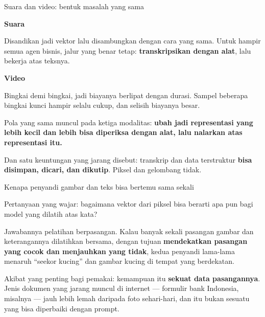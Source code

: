 \documentclass[aspectratio=169,11pt,t]{beamer}
\begin{document}
\begin{frame}[shrink=25]{Suara dan video: bentuk masalah yang sama}
\begin{minipage}[t]{0.485\textwidth}
{\fontsize{9.4}{12.6}\selectfont\color{fg2}\textbf{Suara}\par}\vskip 4pt
{\fontsize{9.4}{12.6}\selectfont\color{fg2}Disandikan jadi vektor lalu disambungkan dengan cara yang sama. Untuk hampir semua agen bisnis, jalur yang benar tetap: \textbf{transkripsikan dengan alat}, lalu bekerja atas teksnya.\par}\vskip 4pt

\end{minipage}%
\hfill
\begin{minipage}[t]{0.485\textwidth}
{\fontsize{9.4}{12.6}\selectfont\color{fg2}\textbf{Video}\par}\vskip 4pt
{\fontsize{9.4}{12.6}\selectfont\color{fg2}Bingkai demi bingkai, jadi biayanya berlipat dengan durasi. Sampel beberapa bingkai kunci hampir selalu cukup, dan selisih biayanya besar.\par}\vskip 4pt

\end{minipage}%
{\fontsize{9.4}{12.6}\selectfont\color{fg2}Pola yang sama muncul pada ketiga modalitas: \textbf{ubah jadi representasi yang lebih kecil dan lebih bisa diperiksa dengan alat, lalu nalarkan atas representasi itu.}\par}\vskip 4pt
\begin{iband}[signal]
Dan satu keuntungan yang jarang disebut: transkrip dan data terstruktur \textbf{bisa disimpan, dicari, dan dikutip}. Piksel dan gelombang tidak.
\end{iband}
\end{frame}

\begin{frame}[shrink=25]{Kenapa penyandi gambar dan teks bisa bertemu sama sekali}
{\fontsize{9.4}{12.6}\selectfont\color{fg2}Pertanyaan yang wajar: bagaimana vektor dari piksel bisa berarti apa pun bagi model yang dilatih atas kata?\par}\vskip 4pt
{\fontsize{9.4}{12.6}\selectfont\color{fg2}Jawabannya pelatihan berpasangan. Kalau banyak sekali pasangan gambar dan keterangannya dilatihkan bersama, dengan tujuan \textbf{mendekatkan pasangan yang cocok dan menjauhkan yang tidak}, kedua penyandi lama-lama menaruh ``seekor kucing'' dan gambar kucing di tempat yang berdekatan.\par}\vskip 4pt
\begin{iband}[signal]
Akibat yang penting bagi pemakai: kemampuan itu \textbf{sekuat data pasangannya}. Jenis dokumen yang jarang muncul di internet --- formulir bank Indonesia, misalnya --- jauh lebih lemah daripada foto sehari-hari, dan itu bukan sesuatu yang bisa diperbaiki dengan prompt.
\end{iband}
\end{frame}
\end{document}
